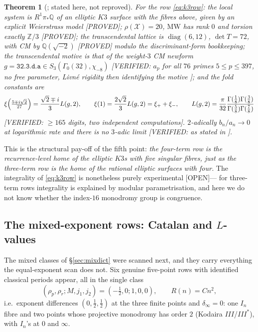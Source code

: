 \documentclass[11pt,reqno]{amsart}
\theoremstyle{plain}
\newtheorem{theorem}{Theorem}[section]
\theoremstyle{definition}
\theoremstyle{remark}
\theoremstyle{plain}
\newcommand{\Z}{\mathbb{Z}}
\newcommand{\Q}{\mathbb{Q}}
\newcommand{\Proved}{\textup{\textsf{[PROVED]}}}
\newcommand{\Verified}[1]{\textup{\textsf{[VERIFIED: #1]}}}
\newcommand{\Open}{\textup{\textsf{[OPEN]}}}
\begin{document}
\begin{theorem}[\cite{K3PAPER,K3P}; stated here, not reproved]\label{thm:k3}
For the row \eqref{eq:k3row}: the local system is $R^1\pi_*\Q$ of an elliptic
$K3$ surface with the fibres above, given by an explicit Weierstrass model
\Proved; $\rho(\mathcal X)=20$, $\mathrm{MW}$ has rank $0$ and torsion exactly
$\Z/3$ \Proved; the transcendental lattice is $\operatorname{diag}(6,12)$,
$\det T=72$, with CM by $\Q(\sqrt{-2})$ \Proved{} modulo the discriminant-form
bookkeeping; the transcendental motive is that of the weight-$3$ CM newform
$g=\texttt{32.3.d.a}\in S_3(\Gamma_0(32),\chi_{-8})$ \Verified{$a_p$ for all $76$
primes $5\le p\le397$, no free parameter, Livn\'e rigidity then identifying the
motive \cite{Livne}}; and the fold constants are
\[
\xi\Bigl(\tfrac{5\mp i\sqrt2}{27}\Bigr)=\frac{\sqrt2\mp i}{3}L(g,2),
\qquad
\xi(1)=\frac{2\sqrt2}{3}L(g,2)=\xi_++\xi_-,
\qquad
L(g,2)=\frac{\pi}{32}\frac{\Gamma(\tfrac18)\Gamma(\tfrac38)}{\Gamma(\tfrac58)\Gamma(\tfrac78)}
\]
\Verified{$\ge165$ digits, two independent computations}. $2$-adically
$b_n/a_n\to0$ at logarithmic rate and there is no $3$-adic limit
\Verified{as stated in \cite{K3P}}.
\end{theorem}

This is the structural pay-off of the fifth point: \emph{the four-term row is the
recurrence-level home of the elliptic $K3$s with five singular fibres, just as
the three-term row is the home of the rational elliptic surfaces with four.} The
integrality of \eqref{eq:k3row} is nonetheless purely experimental \Open --- for
three-term rows integrality is explained by modular parametrisation, and here we
do not know whether the index-$16$ monodromy group is congruence.

\subsection{The mixed-exponent rows: Catalan and $L$-values}\label{sec:mixed}
The mixed classes of \S\ref{sec:mixdict} were scanned next, and they carry
everything the equal-exponent scan does not. Six genuine five-point rows with
identified classical periods appear, all in the single class
\[
(\rho_p,\rho_r;M,j_1,j_2)=(-\tfrac12,0;1,0,0),\qquad R(n)=Cn^2,
\]
i.e.\ exponent differences $(0,\tfrac12,\tfrac12)$ at the three finite points
and $\delta_\infty=0$: one $I_n$ fibre and two points whose projective monodromy
has order $2$ (Kodaira $III$/$III^*$), with $I_n$'s at $0$ and $\infty$.
\end{document}
